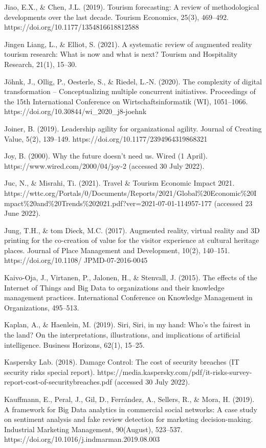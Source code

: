 \documentclass[
  letterpaper,
  DIV=11,
  numbers=noendperiod]{scrreprt}
\begin{document}
Jiao, E.X., \& Chen, J.L. (2019). Tourism forecasting: A review of
methodological developments over the last decade. Tourism Economics,
25(3), 469--492. https://doi.org/10.1177/1354816618812588

Jingen Liang, L., \& Elliot, S. (2021). A systematic review of augmented
reality tourism research: What is now and what is next? Tourism and
Hospitality Research, 21(1), 15--30.

Jöhnk, J., Ollig, P., Oesterle, S., \& Riedel, L.-N. (2020). The
complexity of digital transformation -- Conceptualizing multiple
concurrent initiatives. Proceedings of the 15th International Conference
on Wirtschaftsinformatik (WI), 1051--1066.
https://doi.org/10.30844/wi\_2020\_j8-joehnk

Joiner, B. (2019). Leadership agility for organizational agility.
Journal of Creating Value, 5(2), 139--149.
https://doi.org/10.1177/2394964319868321

Joy, B. (2000). Why the future doesn't need us. Wired (1 April).
https://www.wired.com/2000/04/joy-2 (accessed 30 July 2022).

Juc, N., \& Misrahi, Ti. (2021). Travel \& Tourism Economic Impact 2021.
https://wttc.org/Portals/0/Documents/Reports/2021/Global\%20Economic\%20Impact\%20and\%20Trends\%202021.pdf?ver=2021-07-01-114957-177
(accessed 23 June 2022).

Jung, T.H., \& tom Dieck, M.C. (2017). Augmented reality, virtual
reality and 3D printing for the co-creation of value for the visitor
experience at cultural heritage places. Journal of Place Management and
Development, 10(2), 140--151. https://doi.org/10.1108/ JPMD-07-2016-0045

Kaivo-Oja, J., Virtanen, P., Jalonen, H., \& Stenvall, J. (2015). The
effects of the Internet of Things and Big Data to organizations and
their knowledge management practices. International Conference on
Knowledge Management in Organizations, 495--513.

Kaplan, A., \& Haenlein, M. (2019). Siri, Siri, in my hand: Who's the
fairest in the land? On the interpretations, illustrations, and
implications of artificial intelligence. Business Horizons, 62(1),
15--25.

Kaspersky Lab. (2018). Damage Control: The cost of security breaches (IT
security risks special report).
https://media.kaspersky.com/pdf/it-risks-survey-report-cost-of-securitybreaches.pdf
(accessed 30 July 2022).

Kauffmann, E., Peral, J., Gil, D., Ferrández, A., Sellers, R., \& Mora,
H. (2019). A framework for Big Data analytics in commercial social
networks: A case study on sentiment analysis and fake review detection
for marketing decision-making. Industrial Marketing Management,
90(August), 523--537. https://doi.org/10.1016/j.indmarman.2019.08.003
\end{document}
